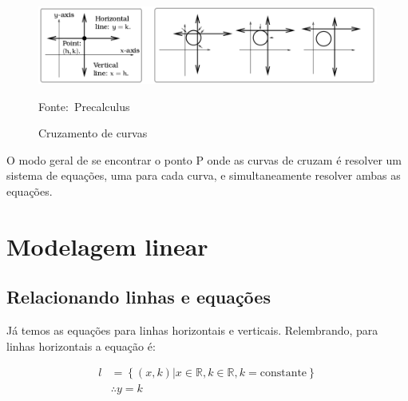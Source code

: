 \documentclass[pdftex, brazil, 12pt, twoside]{article}
\begin{document}
\begin{figure}[ht]
  \begin{center}
    \caption{Cruzamento de curvas}
    \label{fig:curvas-cruzamento-1}
    \includegraphics[scale=0.6]{imagens/cruzamento-curvas-1.png}
    
    \footnotesize{Fonte:~Precalculus}
  \end{center}
\end{figure}

O modo geral de se encontrar o ponto P onde as curvas de cruzam é resolver um
sistema de equações, uma para cada curva, e simultaneamente resolver ambas as
equações.


\section{Modelagem linear}
\label{modelagem-linear}

\subsection{Relacionando linhas e equações}
\label{modelagem-linear-relacionando-linhas}

Já temos as equações para linhas horizontais e verticais. Relembrando, para linhas horizontais
a equação é:

\begin{equation}
  \begin{split}
               l & = \left\{(x, k) | x \in \mathbb{R}, k \in \mathbb{R}, k = \text{constante}\right\}\\
                 & \therefore y = k
  \end{split}
\end{equation}
\end{document}
